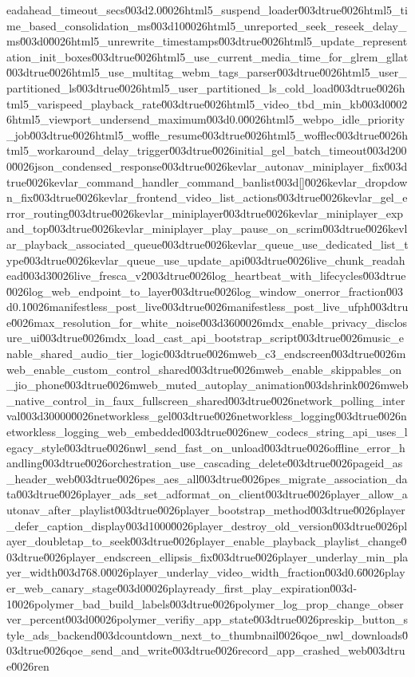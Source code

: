 {eadahead_timeout_secs\u003d2.0\u0026html5_suspend_loader\u003dtrue\u0026html5_time_based_consolidation_ms\u003d10\u0026html5_unreported_seek_reseek_delay_ms\u003d0\u0026html5_unrewrite_timestamps\u003dtrue\u0026html5_update_representation_init_boxes\u003dtrue\u0026html5_use_current_media_time_for_glrem_gllat\u003dtrue\u0026html5_use_multitag_webm_tags_parser\u003dtrue\u0026html5_user_partitioned_ls\u003dtrue\u0026html5_user_partitioned_ls_cold_load\u003dtrue\u0026html5_varispeed_playback_rate\u003dtrue\u0026html5_video_tbd_min_kb\u003d0\u0026html5_viewport_undersend_maximum\u003d0.0\u0026html5_webpo_idle_priority_job\u003dtrue\u0026html5_woffle_resume\u003dtrue\u0026html5_wofflec\u003dtrue\u0026html5_workaround_delay_trigger\u003dtrue\u0026initial_gel_batch_timeout\u003d2000\u0026json_condensed_response\u003dtrue\u0026kevlar_autonav_miniplayer_fix\u003dtrue\u0026kevlar_command_handler_command_banlist\u003d[]\u0026kevlar_dropdown_fix\u003dtrue\u0026kevlar_frontend_video_list_actions\u003dtrue\u0026kevlar_gel_error_routing\u003dtrue\u0026kevlar_miniplayer\u003dtrue\u0026kevlar_miniplayer_expand_top\u003dtrue\u0026kevlar_miniplayer_play_pause_on_scrim\u003dtrue\u0026kevlar_playback_associated_queue\u003dtrue\u0026kevlar_queue_use_dedicated_list_type\u003dtrue\u0026kevlar_queue_use_update_api\u003dtrue\u0026live_chunk_readahead\u003d3\u0026live_fresca_v2\u003dtrue\u0026log_heartbeat_with_lifecycles\u003dtrue\u0026log_web_endpoint_to_layer\u003dtrue\u0026log_window_onerror_fraction\u003d0.1\u0026manifestless_post_live\u003dtrue\u0026manifestless_post_live_ufph\u003dtrue\u0026max_resolution_for_white_noise\u003d360\u0026mdx_enable_privacy_disclosure_ui\u003dtrue\u0026mdx_load_cast_api_bootstrap_script\u003dtrue\u0026music_enable_shared_audio_tier_logic\u003dtrue\u0026mweb_c3_endscreen\u003dtrue\u0026mweb_enable_custom_control_shared\u003dtrue\u0026mweb_enable_skippables_on_jio_phone\u003dtrue\u0026mweb_muted_autoplay_animation\u003dshrink\u0026mweb_native_control_in_faux_fullscreen_shared\u003dtrue\u0026network_polling_interval\u003d30000\u0026networkless_gel\u003dtrue\u0026networkless_logging\u003dtrue\u0026networkless_logging_web_embedded\u003dtrue\u0026new_codecs_string_api_uses_legacy_style\u003dtrue\u0026nwl_send_fast_on_unload\u003dtrue\u0026offline_error_handling\u003dtrue\u0026orchestration_use_cascading_delete\u003dtrue\u0026pageid_as_header_web\u003dtrue\u0026pes_aes_all\u003dtrue\u0026pes_migrate_association_data\u003dtrue\u0026player_ads_set_adformat_on_client\u003dtrue\u0026player_allow_autonav_after_playlist\u003dtrue\u0026player_bootstrap_method\u003dtrue\u0026player_defer_caption_display\u003d1000\u0026player_destroy_old_version\u003dtrue\u0026player_doubletap_to_seek\u003dtrue\u0026player_enable_playback_playlist_change\u003dtrue\u0026player_endscreen_ellipsis_fix\u003dtrue\u0026player_underlay_min_player_width\u003d768.0\u0026player_underlay_video_width_fraction\u003d0.6\u0026player_web_canary_stage\u003d0\u0026playready_first_play_expiration\u003d-1\u0026polymer_bad_build_labels\u003dtrue\u0026polymer_log_prop_change_observer_percent\u003d0\u0026polymer_verifiy_app_state\u003dtrue\u0026preskip_button_style_ads_backend\u003dcountdown_next_to_thumbnail\u0026qoe_nwl_downloads\u003dtrue\u0026qoe_send_and_write\u003dtrue\u0026record_app_crashed_web\u003dtrue\u0026ren}
